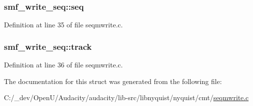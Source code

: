 \subsubsection[{\texorpdfstring{seq}{seq}}]{ smf\+\_\+write\+\_\+seq\+::seq}\hypertarget{structsmf__write__seq_a72ac3f8583c15f31fc4861c0ac45e14f}{}\label{structsmf__write__seq_a72ac3f8583c15f31fc4861c0ac45e14f}


Definition at line 35 of file seqmwrite.\+c.

\subsubsection[{\texorpdfstring{track}{track}}]{ smf\+\_\+write\+\_\+seq\+::track}\hypertarget{structsmf__write__seq_aedc9df4cdb646d9de42aff9ea477e335}{}\label{structsmf__write__seq_aedc9df4cdb646d9de42aff9ea477e335}


Definition at line 36 of file seqmwrite.\+c.



The documentation for this struct was generated from the following file\+:\begin{DoxyCompactItemize}
\item 
C\+:/\+\_\+dev/\+Open\+U/\+Audacity/audacity/lib-\/src/libnyquist/nyquist/cmt/\hyperlink{seqmwrite_8c}{seqmwrite.\+c}\end{DoxyCompactItemize}
